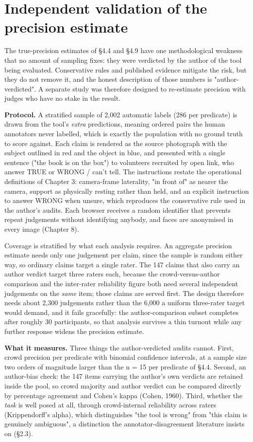 \section{Independent validation of the precision estimate}

The true-precision estimates of \S4.4 and \S4.9 have one methodological weakness that no amount of sampling fixes: they were verdicted by the author of the tool being evaluated. Conservative rules and published evidence mitigate the risk, but they do not remove it, and the honest description of those numbers is "author-verdicted". A separate study was therefore designed to re-estimate precision with judges who have no stake in the result.

\textbf{Protocol.} A stratified sample of 2,002 automatic labels (286 per predicate) is drawn from the tool's \textit{extra} predictions, meaning ordered pairs the human annotators never labelled, which is exactly the population with no ground truth to score against. Each claim is rendered as the source photograph with the subject outlined in red and the object in blue, and presented with a single sentence ("the book is on the box") to volunteers recruited by open link, who answer TRUE or WRONG / can't tell. The instructions restate the operational definitions of Chapter 3: camera-frame laterality, "in front of" as nearer the camera, support as physically resting rather than held, and an explicit instruction to answer WRONG when unsure, which reproduces the conservative rule used in the author's audits. Each browser receives a random identifier that prevents repeat judgements without identifying anybody, and faces are anonymised in every image (Chapter 8).

Coverage is stratified by what each analysis requires. An aggregate precision estimate needs only one judgement per claim, since the sample is random either way, so ordinary claims target a single rater. The 147 claims that also carry an author verdict target three raters each, because the crowd-versus-author comparison and the inter-rater reliability figure both need several independent judgements on the \textit{same} item; those claims are served first. The design therefore needs about 2,300 judgements rather than the 6,000 a uniform three-rater target would demand, and it fails gracefully: the author-comparison subset completes after roughly 30 participants, so that analysis survives a thin turnout while any further response widens the precision estimate.

\textbf{What it measures.} Three things the author-verdicted audits cannot. First, crowd precision per predicate with binomial confidence intervals, at a sample size two orders of magnitude larger than the n = 15 per predicate of \S4.4. Second, an author-bias check: the 147 items carrying the author's own verdicts are retained inside the pool, so crowd majority and author verdict can be compared directly by percentage agreement and Cohen's kappa (Cohen, 1960). Third, whether the \textit{task} is well posed at all, through crowd-internal reliability across raters (Krippendorff's alpha), which distinguishes "the tool is wrong" from "this claim is genuinely ambiguous", a distinction the annotator-disagreement literature insists on (\S2.3).

